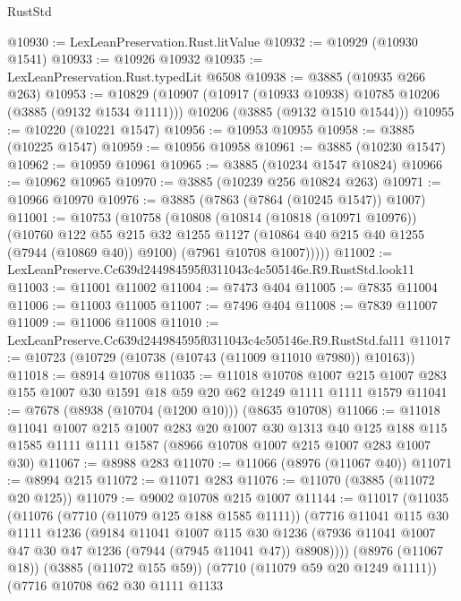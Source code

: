 \begin{lexlean}{RustStd}
\begin{coremodule}
@10930 := LexLeanPreservation.Rust.litValue
@10932 := @10929 (@10930 @1541)
@10933 := @10926 @10932
@10935 := LexLeanPreservation.Rust.typedLit @6508
@10938 := @3885 (@10935 @266 @263)
@10953 := @10829
    (@10907
      (@10917 (@10933 @10938) @10785 @10206 (@3885 (@9132 @1534 @1111)))
      @10206
      (@3885 (@9132 @1510 @1544)))
@10955 := @10220 (@10221 @1547)
@10956 := @10953 @10955
@10958 := @3885 (@10225 @1547)
@10959 := @10956 @10958
@10961 := @3885 (@10230 @1547)
@10962 := @10959 @10961
@10965 := @3885 (@10234 @1547 @10824)
@10966 := @10962 @10965
@10970 := @3885 (@10239 @256 @10824 @263)
@10971 := @10966 @10970
@10976 := @3885 (@7863 (@7864 (@10245 @1547)) @1007)
@11001 := @10753
    (@10758
      (@10808
        (@10814
          (@10818 (@10971 @10976))
          (@10760
            @122
            @55
            @215
            @32
            @1255
            @1127
            (@10864 @40 @215 @40 @1255 (@7944 (@10869 @40)) @9100)
            (@7961 @10708 @1007)))))
@11002 := LexLeanPreserve.Cc639d244984595f0311043c4c505146e.R9.RustStd.look11
@11003 := @11001 @11002
@11004 := @7473 @404
@11005 := @7835 @11004
@11006 := @11003 @11005
@11007 := @7496 @404
@11008 := @7839 @11007
@11009 := @11006 @11008
@11010 := LexLeanPreserve.Cc639d244984595f0311043c4c505146e.R9.RustStd.fal11
@11017 := @10723 (@10729 (@10738 (@10743 (@11009 @11010 @7980)) @10163))
@11018 := @8914 @10708
@11035 := @11018
    @10708
    @1007
    @215
    @1007
    @283
    @155
    @1007
    @30
    @1591
    @18
    @59
    @20
    @62
    @1249
    @1111
    @1111
    @1579
@11041 := @7678 (@8938 (@10704 (@1200 @10))) (@8635 @10708)
@11066 := @11018
    @11041
    @1007
    @215
    @1007
    @283
    @20
    @1007
    @30
    @1313
    @40
    @125
    @188
    @115
    @1585
    @1111
    @1111
    @1587
    (@8966 @10708 @1007 @215 @1007 @283 @1007 @30)
@11067 := @8988 @283
@11070 := @11066 (@8976 (@11067 @40))
@11071 := @8994 @215
@11072 := @11071 @283
@11076 := @11070 (@3885 (@11072 @20 @125))
@11079 := @9002 @10708 @215 @1007
@11144 := @11017
    (@11035
      (@11076
        (@7710 (@11079 @125 @188 @1585 @1111))
        (@7716
          @11041
          @115
          @30
          @1111
          @1236
          (@9184
            @11041
            @1007
            @115
            @30
            @1236
            (@7936 @11041 @1007 @47 @30 @47 @1236 (@7944 (@7945 @11041 @47)) @8908))))
      (@8976 (@11067 @18))
      (@3885 (@11072 @155 @59))
      (@7710 (@11079 @59 @20 @1249 @1111))
      (@7716
        @10708
        @62
        @30
        @1111
        @1133

\end{coremodule}
\end{lexlean}
